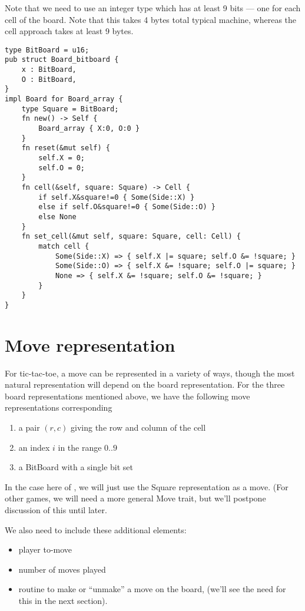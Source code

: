 \documentclass[10pt,dvipdfmx,letterpaper]{report}
\newcommand{\g}[1]{{\sc{#1}}\index{{\sc{#1}}}}
\begin{document}
Note that we need to use an integer type which has at least 9 bits --- one for each cell
of the board.  Note that this takes 4 bytes total typical machine, whereas the cell approach
takes at least 9 bytes.
{\scriptsize
\begin{verbatim}
type BitBoard = u16;
pub struct Board_bitboard {
    x : BitBoard,
    O : BitBoard,
}
impl Board for Board_array {
    type Square = BitBoard;
    fn new() -> Self {
        Board_array { X:0, O:0 }
    }
    fn reset(&mut self) {
        self.X = 0;
        self.O = 0;
    }
    fn cell(&self, square: Square) -> Cell {
        if self.X&square!=0 { Some(Side::X) }
        else if self.O&square!=0 { Some(Side::O) }
        else None
    }
    fn set_cell(&mut self, square: Square, cell: Cell) {
        match cell {
            Some(Side::X) => { self.X |= square; self.O &= !square; }
            Some(Side::O) => { self.X &= !square; self.O |= square; }
            None => { self.X &= !square; self.O &= !square; }
        }
    }
}
\end{verbatim}
}

\section{Move representation}
For tic-tac-toe, a move can be represented in a variety of ways, though the most
natural representation will depend on the board representation.  For the three board representations
mentioned above, we have the following move representations corresponding
\begin{enumerate}
\item a pair $(r,c)$ giving the row and column of the cell
\item an index $i$ in the range $0..9$
\item a BitBoard with a single bit set
\end{enumerate}

In the case here of \g{tic-tac-toe}, we will just use the Square representation as a move.  (For other games,
we will need a more general Move trait, but we'll postpone discussion of this until later.

We also need to include these additional elements:
\begin{itemize}
\item player to-move
\item number of moves played
\item routine to make or ``unmake'' a move on the board, (we'll see the need for this in the next section).
\end{itemize}
\end{document}
